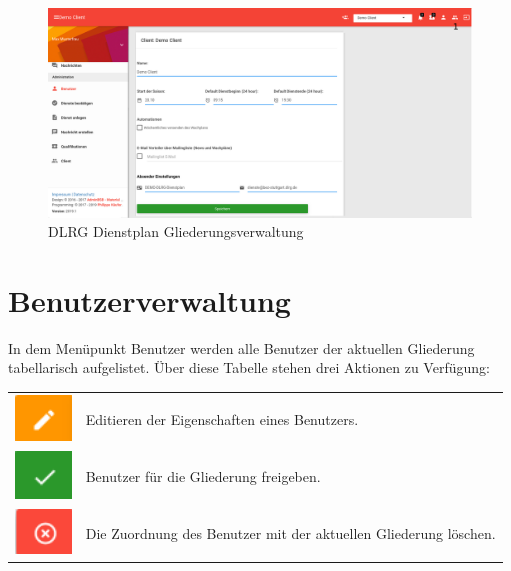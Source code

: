 \begin{figure}[h]
	\begin{addmargin}{-0.2\linewidth}
		\centering 
		\includegraphics[width=20cm]{Bilder/view_admin.png}
	\end{addmargin} 
	\caption[Gliederungsverwaltung]{DLRG Dienstplan Gliederungsverwaltung}
	\label{fig:view_client}
\end{figure}

\section{Benutzerverwaltung}
\label{sec:admin_benutzerverwaltung}
In dem Menüpunkt Benutzer werden alle Benutzer der aktuellen Gliederung tabellarisch aufgelistet. Über diese Tabelle stehen drei Aktionen zu Verfügung:

\begin{table}[H]
	\centering
	\begin{tabular}{ll}
		\includegraphics[width=1.5cm]{Bilder/edit.png} & Editieren der Eigenschaften eines Benutzers. \\[10pt]
		\includegraphics[width=1.5cm]{Bilder/approve.png}	& Benutzer für die Gliederung freigeben. \\[10pt]
		\includegraphics[width=1.5cm]{Bilder/remove.png} & Die Zuordnung des Benutzer mit der aktuellen Gliederung löschen. \\
	\end{tabular}
\end{table}

